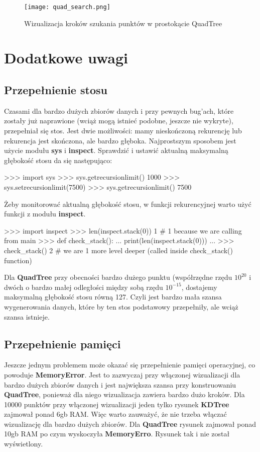 \documentclass[a4paper, 12pt]{article}
\begin{document}
        \begin{figure}[h!]
        \centering
          \texttt{[image: quad\_search.png]}
          \caption{Wizualizacja kroków szukania punktów w prostokącie QuadTree}
        \end{figure}

  \section{Dodatkowe uwagi}
    \subsection{Przepełnienie stosu}
      \quad Czasami dla bardzo dużych zbiorów danych i przy pewnych bug'ach, które zostały już naprawione (wciąż mogą istnieć podobne, jeszcze nie wykryte), przepełniał się stos. Jest dwie możliwości: mamy nieskończoną rekurencję lub rekurencja jest skończona, ale bardzo głęboka. Najprostszym sposobem jest użycie modułu \textbf{sys} i \textbf{inspect}. Sprawdzić i ustawić aktualną maksymalną głębokość stosu da się następująco:
      \begin{python}
      >>> import sys
      >>> sys.getrecursionlimit()
      1000
      >>> sys.setrecursionlimit(7500)
      >>> sys.getrecursionlimit()
      7500
      \end{python}

      \noindent
      \quad Żeby monitorować aktualną głębokość stosu, w funkcji rekurencyjnej warto użyć funkcji z modułu \textbf{inspect}.
      \begin{python}
      >>> import inspect
      >>> len(inspect.stack(0))
      1  # 1 because we are calling from main
      >>> def check_stack():
      ...     print(len(inspect.stack(0)))
      ...
      >>> check_stack()
      2  # we are 1 more level deeper (called inside check_stack() function)
      \end{python}

      \noindent
      \quad Dla \textbf{QuadTree} przy obecności bardzo dużego punktu (współrzędne rzędu $10^{20}$ i dwóch o bardzo małej odległości między sobą rzędu $10^{-15}$, dostajemy maksymalną głębokość stosu równą 127. Czyli jest bardzo mała szansa wygenerowania danych, które by ten stos podstawowy przepełniły, ale wciąż szansa istnieje.

    \subsection{Przepełnienie pamięci}
      \quad Jeszcze jednym problemem może okazać się przepełnienie pamięci operacyjnej, co powoduje \textbf{MemoryError}. Jest to zazwyczaj przy włączonej wizualizacji dla bardzo dużych zbiorów danych i jest największa szansa przy konstruowaniu \textbf{QuadTree}, ponieważ dla niego wizualizacja zawiera bardzo dużo kroków. Dla 10000 punktów przy włączonej wizualizacji jeden tylko rysunek \textbf{KDTree} zajmował ponad 6gb RAM. Więc warto zauważyć, że nie trzeba włączać wizualizację dla bardzo dużych zbiorów. Dla \textbf{QuadTree} rysunek zajmował ponad 10gb RAM po czym wyskoczyła \textbf{MemoryErro}. Rysunek tak i nie został wyświetlony.
\end{document}
